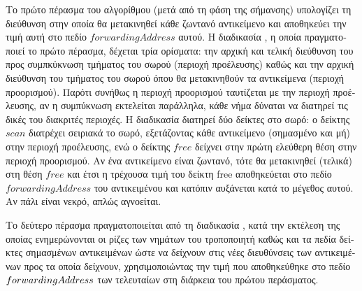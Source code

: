 \begin{greek}
Το πρώτο πέρασμα του αλγορίθμου (μετά από τη φάση της σήμανσης) υπολογίζει τη διεύθυνση 
στην οποία θα μετακινηθεί κάθε ζωντανό αντικείμενο και αποθηκεύει την τιμή αυτή στο πεδίο 
$forwardingAddress$ αυτού. Η διαδικασία \textenglish{}, η οποία πραγματοποιεί 
το πρώτο πέρασμα, δέχεται τρία ορίσματα: την αρχική και τελική διεύθυνση του προς 
συμπκύκνωση τμήματος του σωρού (περιοχή προέλευσης) καθώς και την αρχική διεύθυνση του 
τμήματος του σωρού όπου θα μετακινηθούν τα αντικείμενα (περιοχή προορισμού). Παρότι συνήθως 
η περιοχή προορισμού ταυτίζεται με την περιοχή προέλευσης, αν η συμπύκνωση εκτελείται 
παράλληλα, κάθε νήμα δύναται να διατηρεί τις δικές του διακριτές περιοχές. Η διαδικασία 
\textenglish{} διατηρεί δύο δείκτες στο σωρό: ο δείκτης $scan$ διατρέχει 
σειριακά το σωρό, εξετάζοντας κάθε αντικείμενο (σημασμένο και μή) στην περιοχή προέλευσης, 
ενώ ο δείκτης $free$ δείχνει στην πρώτη ελεύθερη θέση στην περιοχή προορισμού. Αν ένα 
αντικείμενο είναι ζωντανό, τότε θα μετακινηθεί (τελικά) στη θέση $free$ και έτσι η τρέχουσα
τιμή του δείκτη free αποθηκεύεται στο πεδίο $forwardingAddress$ του αντικειμένου και κατόπιν 
αυξάνεται κατά το μέγεθος αυτού. Αν πάλι είναι νεκρό, απλώς αγνοείται.

Το δεύτερο πέρασμα πραγματοποιείται από τη διαδικασία \textenglish{},
κατά την εκτέλεση της οποίας ενημερώνονται οι ρίζες των νημάτων του τροποποιητή καθώς και τα πεδία
δείκτες σημασμένων αντικειμένων ώστε να δείχνουν στις νέες διευθύνσεις των αντικειμένων προς 
τα οποία δείχνουν, χρησιμοποιώντας την τιμή που αποθηκεύθηκε στο πεδίο $forwarding\-Address$ 
των τελευταίων στη διάρκεια του πρώτου περάσματος. 


\end{greek}

